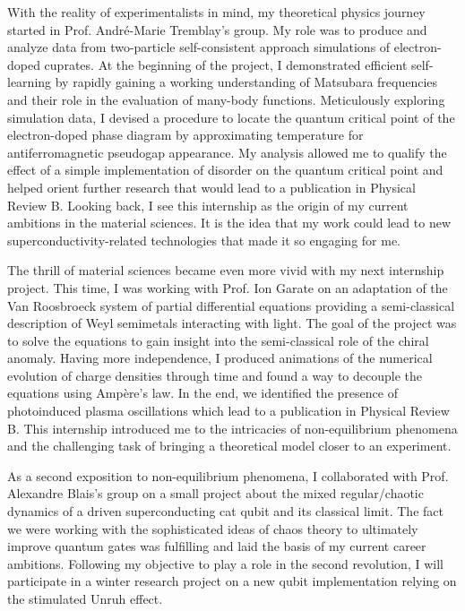 \documentclass[12pt]{article}
\begin{document}
With the reality of experimentalists in mind, my theoretical physics journey started in Prof. André-Marie Tremblay's group. My role was to produce and analyze data from two-particle self-consistent approach simulations of electron-doped cuprates. At the beginning of the project, I demonstrated efficient self-learning by rapidly gaining a working understanding of Matsubara frequencies and their role in the evaluation of many-body functions. Meticulously exploring simulation data, I devised a procedure to locate the quantum critical point of the electron-doped phase diagram by approximating temperature for antiferromagnetic pseudogap appearance. My analysis allowed me to qualify the effect of a simple implementation of disorder on the quantum critical point and helped orient further research that would lead to a publication in Physical Review B. Looking back, I see this internship as the origin of my current ambitions in the material sciences. It is the idea that my work could lead to new superconductivity-related technologies that made it so engaging for me. 

The thrill of material sciences became even more vivid with my next internship project. This time, I was working with Prof. Ion Garate on an adaptation of the Van Roosbroeck system of partial differential equations providing a semi-classical description of Weyl semimetals interacting with light. The goal of the project was to solve the equations to gain insight into the semi-classical role of the chiral anomaly. Having more independence, I produced animations of the numerical evolution of charge densities through time and found a way to decouple the equations using Ampère's law. In the end, we identified the presence of photoinduced plasma oscillations which lead to a publication in Physical Review B. This internship introduced me to the intricacies of non-equilibrium phenomena and the challenging task of bringing a theoretical model closer to an experiment. 

As a second exposition to non-equilibrium phenomena, I collaborated with Prof. Alexandre Blais's group on a small project about the mixed regular/chaotic dynamics of a driven superconducting cat qubit and its classical limit. The fact we were working with the sophisticated ideas of chaos theory to ultimately improve quantum gates was fulfilling and laid the basis of my current career ambitions. Following my objective to play a role in the second revolution, I will participate in a winter research project on a new qubit implementation relying on the stimulated Unruh effect. 
\end{document}
